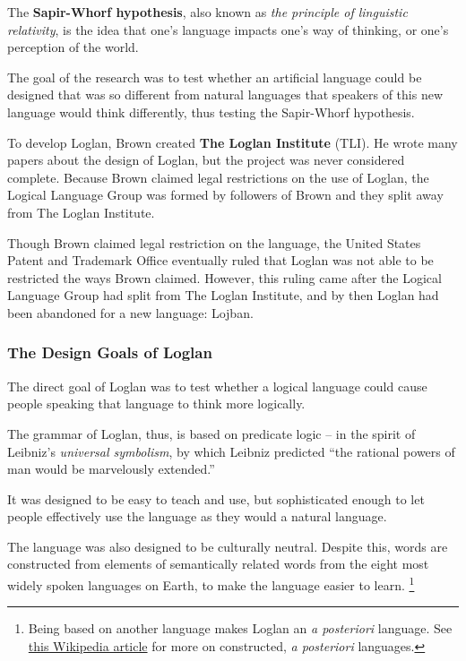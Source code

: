 \documentclass[12pt]{book}
\begin{document}
The \textbf{Sapir-Whorf hypothesis}, also known as \emph{the principle of linguistic relativity}, is the idea that one's language impacts one's way of thinking, or one's perception of the world.

The goal of the research was to test whether an artificial language could be designed that was so different from natural languages that speakers of this new language would think differently, thus testing the Sapir-Whorf hypothesis. 

To develop Loglan, Brown created \textbf{The Loglan Institute} (TLI). He wrote many papers about the design of Loglan, but the project was never considered complete. Because Brown claimed legal restrictions on the use of Loglan, the Logical Language Group was formed by followers of Brown and they split away from The Loglan Institute. 

Though Brown claimed legal restriction on the language, the United States Patent and Trademark Office eventually ruled that Loglan was not able to be restricted the ways Brown claimed. However, this ruling came after the Logical Language Group had split from The Loglan Institute, and by then Loglan had been abandoned for a new language: Lojban. 



\subsubsection{The Design Goals of Loglan}

The direct goal of Loglan was to test whether a logical language could cause people speaking that language to think more logically. 

The grammar of Loglan, thus, is based on predicate logic -- in the spirit of Leibniz's \emph{universal symbolism}, by which Leibniz predicted ``the rational powers of man would be marvelously extended.'' \cite{Brown1960Loglan} 

It was designed to be easy to teach and use, but sophisticated enough to let people effectively use the language as they would a natural language.

The language was also designed to be culturally neutral. 
Despite this, words are constructed from elements of semantically related words from the eight most widely spoken languages on Earth, to make the language easier to learn. \footnote{Being based on another language makes Loglan an \textit{a posteriori} language. See \href{https://en.wikipedia.org/wiki/Constructed_language\#a_posteriori_language}{this Wikipedia article} for more on constructed, \textit{a posteriori} languages.}
\end{document}
